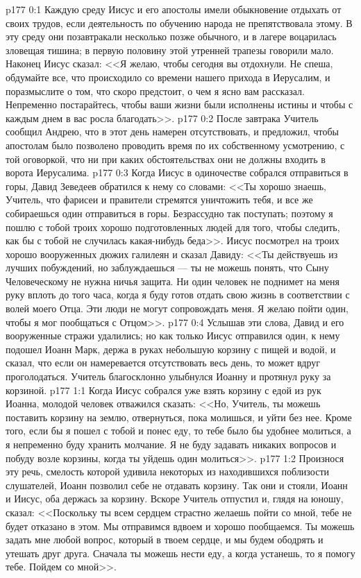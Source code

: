 \vs p177 0:1 Каждую среду Иисус и его апостолы имели обыкновение отдыхать от своих трудов, если деятельность по обучению народа не препятствовала этому. В эту среду они позавтракали несколько позже обычного, и в лагере воцарилась зловещая тишина; в первую половину этой утренней трапезы говорили мало. Наконец Иисус сказал: <<Я желаю, чтобы сегодня вы отдохнули. Не спеша, обдумайте все, что происходило со времени нашего прихода в Иерусалим, и поразмыслите о том, что скоро предстоит, о чем я ясно вам рассказал. Непременно постарайтесь, чтобы ваши жизни были исполнены истины и чтобы с каждым днем в вас росла благодать>>.
\vs p177 0:2 После завтрака Учитель сообщил Андрею, что в этот день намерен отсутствовать, и предложил, чтобы апостолам было позволено проводить время по их собственному усмотрению, с той оговоркой, что ни при каких обстоятельствах они не должны входить в ворота Иерусалима.
\vs p177 0:3 Когда Иисус в одиночестве собрался отправиться в горы, Давид Зеведеев обратился к нему со словами: <<Ты хорошо знаешь, Учитель, что фарисеи и правители стремятся уничтожить тебя, и все же собираешься один отправиться в горы. Безрассудно так поступать; поэтому я пошлю с тобой троих хорошо подготовленных людей для того, чтобы следить, как бы с тобой не случилась какая\hyp{}нибудь беда>>. Иисус посмотрел на троих хорошо вооруженных дюжих галилеян и сказал Давиду: <<Ты действуешь из лучших побуждений, но заблуждаешься --- ты не можешь понять, что Сыну Человеческому не нужна ничья защита. Ни один человек не поднимет на меня руку вплоть до того часа, когда я буду готов отдать свою жизнь в соответствии с волей моего Отца. Эти люди не могут сопровождать меня. Я желаю пойти один, чтобы я мог пообщаться с Отцом>>.
\vs p177 0:4 Услышав эти слова, Давид и его вооруженные стражи удалились; но как только Иисус отправился один, к нему подошел Иоанн Марк, держа в руках небольшую корзину с пищей и водой, и сказал, что если он намеревается отсутствовать весь день, то может вдруг проголодаться. Учитель благосклонно улыбнулся Иоанну и протянул руку за корзиной.
\vs p177 1:1 Когда Иисус собрался уже взять корзину с едой из рук Иоанна, молодой человек отважился сказать: <<Но, Учитель, ты можешь поставить корзину на землю, отвернуться, пока молишься, и уйти без нее. Кроме того, если бы я пошел с тобой и понес еду, то тебе было бы удобнее молиться, а я непременно буду хранить молчание. Я не буду задавать никаких вопросов и побуду возле корзины, когда ты уйдешь один молиться>>.
\vs p177 1:2 Произнося эту речь, смелость которой удивила некоторых из находившихся поблизости слушателей, Иоанн позволил себе не отдавать корзину. Так они и стояли, Иоанн и Иисус, оба держась за корзину. Вскоре Учитель отпустил и, глядя на юношу, сказал: <<Поскольку ты всем сердцем страстно желаешь пойти со мной, тебе не будет отказано в этом. Мы отправимся вдвоем и хорошо пообщаемся. Ты можешь задать мне любой вопрос, который в твоем сердце, и мы будем ободрять и утешать друг друга. Сначала ты можешь нести еду, а когда устанешь, то я помогу тебе. Пойдем со мной>>.
